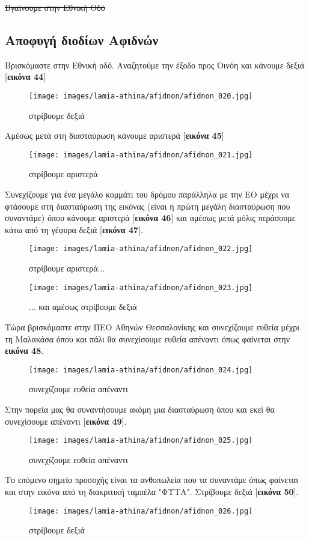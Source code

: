 \sout{Βγαίνουμε στην Εθνική Οδό}
\newpage
\begin{center}
\section*{Αποφυγή διοδίων Αφιδνών}
\end{center}
Βρισκόμαστε στην Εθνική οδό. Αναζητούμε την έξοδο προς Οινόη και κάνουμε δεξιά [\textbf{εικόνα 44}]
\begin{figure}[H]
\texttt{[image: images/lamia-athina/afidnon/afidnon\_020.jpg]} 
\caption{στρίβουμε δεξιά}
\end{figure}
Αμέσως μετά στη διασταύρωση κάνουμε αριστερά [\textbf{εικόνα 45}]
\begin{figure}[H]
\texttt{[image: images/lamia-athina/afidnon/afidnon\_021.jpg]} 
\caption{στρίβουμε αριστερά}
\end{figure}
Συνεχίζουμε για ένα μεγάλο κομμάτι του δρόμου παράλληλα με την ΕΟ μέχρι να φτάσουμε στη διασταύρωση της εικόνας (είναι η πρώτη μεγάλη διασταύρωση που συναντάμε) όπου κάνουμε αριστερά [\textbf{εικόνα 46}] και αμέσως μετά μόλις περάσουμε κάτω από τη γέφυρα δεξιά [\textbf{εικόνα 47}].
\begin{figure}[H]
\texttt{[image: images/lamia-athina/afidnon/afidnon\_022.jpg]} 
\caption{στρίβουμε αριστερά...}
\texttt{[image: images/lamia-athina/afidnon/afidnon\_023.jpg]} 
\caption{... και αμέσως στρίβουμε δεξιά}
\end{figure}
Τώρα βρισκόμαστε στην ΠΕΟ Αθηνών Θεσσαλονίκης και συνεχίζουμε ευθεία μέχρι τη Μαλακάσα όπου και πάλι θα συνεχίσουμε ευθεία απέναντι όπως φαίνεται στην \textbf{εικόνα 48}.
\begin{figure}[H]
\texttt{[image: images/lamia-athina/afidnon/afidnon\_024.jpg]} 
\caption{συνεχίζουμε ευθεία απέναντι}
\end{figure}
Στην πορεία μας θα συναντήσουμε ακόμη μια διασταύρωση όπου και εκεί θα συνεχίσουμε απέναντι [\textbf{εικόνα 49}].
\begin{figure}[H]
\texttt{[image: images/lamia-athina/afidnon/afidnon\_025.jpg]} 
\caption{συνεχίζουμε ευθεία απέναντι}
\end{figure}
Το επόμενο σημείο προσοχής είναι τα ανθοπωλεία που τα συναντάμε όπως φαίνεται και στην εικόνα από τη διακριτική ταμπέλα "ΦΥΤΑ". Στρίβουμε δεξιά [\textbf{εικόνα 50}].
\begin{figure}[H]
\texttt{[image: images/lamia-athina/afidnon/afidnon\_026.jpg]} 
\caption{στρίβουμε δεξιά}
\end{figure}
